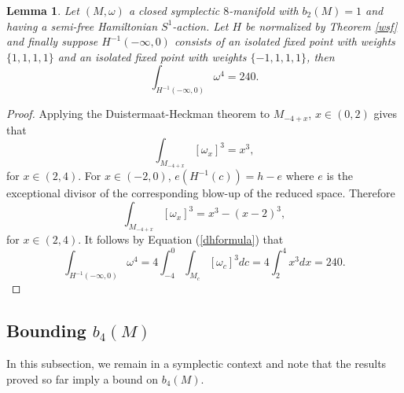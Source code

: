 \documentclass[12pt]{article}
\newtheorem{lemma}[theorem]{Lemma}
\begin{document}
\begin{lemma} \label{intone} Let  $(M,\omega)$  a closed symplectic $8$-manifold  with $b_{2}(M)=1$ and having a semi-free Hamiltonian $S^1$-action. Let $H$ be normalized by Theorem \ref{wsf} and finally suppose $H^{-1}(-\infty,0)$ consists of an isolated fixed point with weights $\{1,1,1,1\}$ and an isolated fixed point with weights $\{-1,1,1,1\}$, then $$\int_{H^{-1}(-\infty,0)} \omega^{4} = 240. $$ 
\end{lemma}
\begin{proof}
Applying the Duistermaat-Heckman theorem to $M_{-4+x}$, $x \in (0,2)$ gives that $$\int_{M_{-4+x}} [\omega_x]^3 =x^3,$$ for $x \in (2,4)$. For $x \in (-2,0)$,  $e(H^{-1}(c)) = h-e$ where $e$ is the exceptional divisor of the corresponding blow-up of the reduced space.  Therefore$$\int_{M_{-4+x}} [\omega_x]^3 =x^3 - (x-2)^3,$$   for $x \in (2,4)$. It follows by Equation (\ref{dhformula}) that $$\int_{H^{-1}(-\infty,0)} \omega^{4} = 4 \int_{-4}^{0}  \int_{M_{c}} [\omega_c]^3 dc =  4 \int_{2}^{4} x^3 dx = 240. $$\end{proof}

\subsection{Bounding $b_{4}(M)$}

In this subsection, we remain in a symplectic context and note that the results proved so far imply a bound on $b_{4}(M)$.
\end{document}
